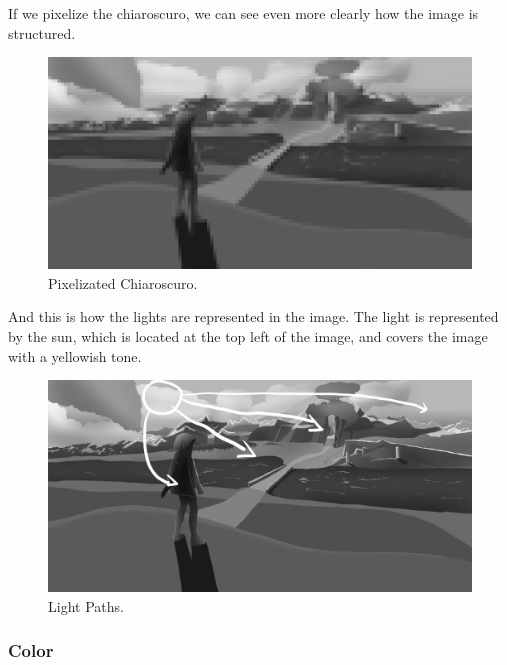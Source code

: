 \documentclass{cup-pan}
\begin{document}
            If we pixelize the chiaroscuro, we can see even more clearly how the image is structured.\\
            \begin{figure}[H]
                \includegraphics[width=\textwidth]{Imagenes/Fanart1/Analysis/pixel.png}
                \caption{Pixelizated Chiaroscuro.}
            \end{figure}

            And this is how the lights are represented in the image.
            The light is represented by the sun, which is located at the top left of the image, and covers the image with a yellowish tone.\\
            \begin{figure}[H]
                \includegraphics[width=\textwidth]{Imagenes/Fanart1/Analysis/recorridoluz.png}
                \caption{Light Paths.}
            \end{figure}

        \subsubsection{Color}
\end{document}
